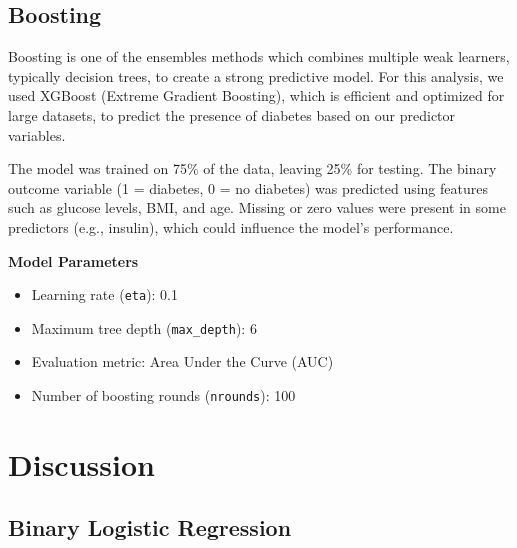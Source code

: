 \documentclass[12pt]{article}
\begin{document}
\subsection{Boosting}

Boosting \cite{chen2015xgboost} \cite{friedman2001greedy} is one of the ensembles methods which combines multiple weak learners, typically decision trees, to create a strong predictive model. For this analysis, we used XGBoost (Extreme Gradient Boosting), which is efficient and optimized for large datasets, to predict the presence of diabetes based on our predictor variables.

The model was trained on 75\% of the data, leaving 25\% for testing. The binary outcome variable (1 = diabetes, 0 = no diabetes) was predicted using features such as glucose levels, BMI, and age. Missing or zero values were present in some predictors (e.g., insulin), which could influence the model's performance.

\textbf{Model Parameters}
\begin{itemize}
	\item Learning rate (\texttt{eta}): 0.1
	\item Maximum tree depth (\texttt{max\_depth}): 6
	\item Evaluation metric: Area Under the Curve (AUC)
	\item Number of boosting rounds (\texttt{nrounds}): 100
\end{itemize}

\section{Discussion}
\subsection{Binary Logistic Regression}
\end{document}
